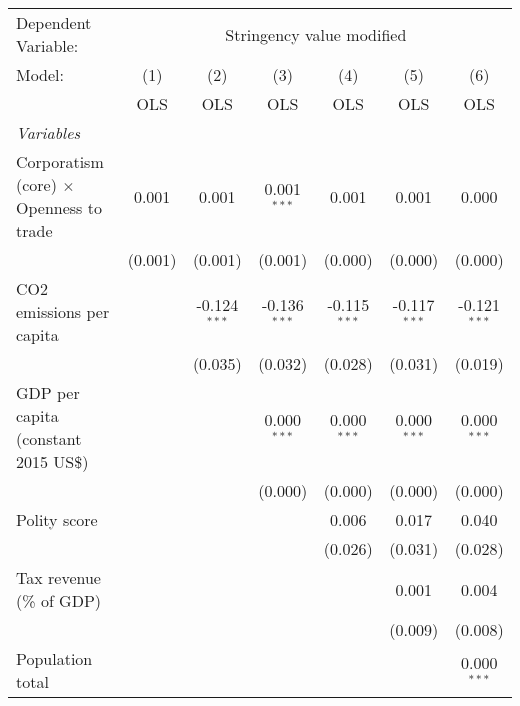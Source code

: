 
\begingroup
\centering
\begin{tabular}{lcccccc}
   \toprule
   Dependent Variable: & \multicolumn{6}{c}{Stringency value modified}\\
   Model:                                         & (1)     & (2)            & (3)            & (4)            & (5)            & (6)\\  
                                                  &  OLS    & OLS            & OLS            & OLS            & OLS            & OLS\\  
   \midrule
   \emph{Variables}\\
   Corporatism (core) $\times$ Openness to trade  & 0.001   & 0.001          & 0.001$^{***}$  & 0.001          & 0.001          & 0.000\\   
                                                  & (0.001) & (0.001)        & (0.001)        & (0.000)        & (0.000)        & (0.000)\\   
   CO2 emissions per capita                       &         & -0.124$^{***}$ & -0.136$^{***}$ & -0.115$^{***}$ & -0.117$^{***}$ & -0.121$^{***}$\\   
                                                  &         & (0.035)        & (0.032)        & (0.028)        & (0.031)        & (0.019)\\   
   GDP per capita (constant 2015 US\$)            &         &                & 0.000$^{***}$  & 0.000$^{***}$  & 0.000$^{***}$  & 0.000$^{***}$\\   
                                                  &         &                & (0.000)        & (0.000)        & (0.000)        & (0.000)\\   
   Polity score                                   &         &                &                & 0.006          & 0.017          & 0.040\\   
                                                  &         &                &                & (0.026)        & (0.031)        & (0.028)\\   
   Tax revenue (\% of GDP)                        &         &                &                &                & 0.001          & 0.004\\   
                                                  &         &                &                &                & (0.009)        & (0.008)\\   
   Population total                               &         &                &                &                &                & 0.000$^{***}$\\   

\end{tabular}
